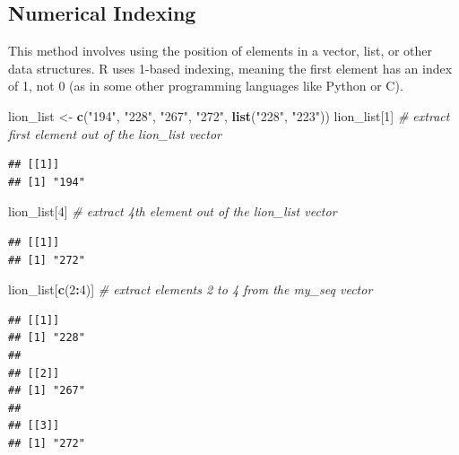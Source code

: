 \documentclass[
]{book}
\newenvironment{Shaded}{\begin{snugshade}}{\end{snugshade}}
\newcommand{\CommentTok}[1]{\textcolor[rgb]{0.56,0.35,0.01}{\textit{#1}}}
\newcommand{\DecValTok}[1]{\textcolor[rgb]{0.00,0.00,0.81}{#1}}
\newcommand{\FunctionTok}[1]{\textcolor[rgb]{0.13,0.29,0.53}{\textbf{#1}}}
\newcommand{\NormalTok}[1]{#1}
\newcommand{\OtherTok}[1]{\textcolor[rgb]{0.56,0.35,0.01}{#1}}
\newcommand{\SpecialCharTok}[1]{\textcolor[rgb]{0.81,0.36,0.00}{\textbf{#1}}}
\newcommand{\StringTok}[1]{\textcolor[rgb]{0.31,0.60,0.02}{#1}}
\begin{document}
\subsection{Numerical Indexing}\label{numerical-indexing}

This method involves using the position of elements in a vector, list, or other data structures. R uses 1-based indexing, meaning the first element has an index of 1, not 0 (as in some other programming languages like Python or C).

\begin{Shaded}
\begin{Highlighting}[]
\NormalTok{lion\_list }\OtherTok{\textless{}{-}} \FunctionTok{c}\NormalTok{(}\StringTok{"194"}\NormalTok{, }\StringTok{"228"}\NormalTok{, }\StringTok{"267"}\NormalTok{, }\StringTok{"272"}\NormalTok{, }\FunctionTok{list}\NormalTok{(}\StringTok{"228"}\NormalTok{, }\StringTok{"223"}\NormalTok{))}
\NormalTok{lion\_list[}\DecValTok{1}\NormalTok{] }\CommentTok{\# extract first element out of the lion\_list vector}
\end{Highlighting}
\end{Shaded}

\begin{verbatim}
## [[1]]
## [1] "194"
\end{verbatim}

\begin{Shaded}
\begin{Highlighting}[]
\NormalTok{lion\_list[}\DecValTok{4}\NormalTok{] }\CommentTok{\# extract 4th element out of the lion\_list vector}
\end{Highlighting}
\end{Shaded}

\begin{verbatim}
## [[1]]
## [1] "272"
\end{verbatim}

\begin{Shaded}
\begin{Highlighting}[]
\NormalTok{lion\_list[}\FunctionTok{c}\NormalTok{(}\DecValTok{2}\SpecialCharTok{:}\DecValTok{4}\NormalTok{)] }\CommentTok{\# extract elements 2 to 4 from the my\_seq vector}
\end{Highlighting}
\end{Shaded}

\begin{verbatim}
## [[1]]
## [1] "228"
## 
## [[2]]
## [1] "267"
## 
## [[3]]
## [1] "272"
\end{verbatim}
\end{document}
